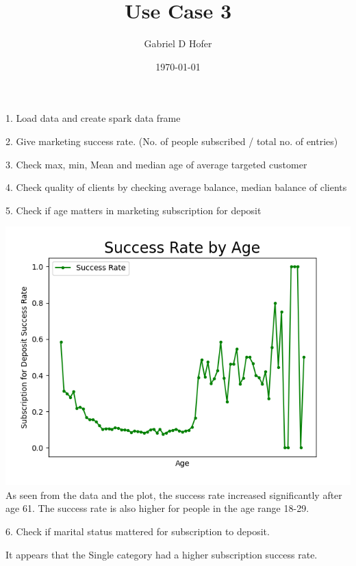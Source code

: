 \documentclass{article}
\title{Use Case 3}
\author{Gabriel D Hofer}
\date\today
\begin{document}
\maketitle



1. Load data and create spark data frame


2. Give marketing success rate. (No. of people subscribed / total no. of entries)


3. Check max, min, Mean and median age of average targeted customer


4. Check quality of clients by checking average balance, median balance of clients


5. Check if age matters in marketing subscription for deposit

\includegraphics[scale=0.85]{images/success_rate_by_age.png}
\newpage
As seen from the data and the plot, the success rate increased significantly after age 61.
The success rate is also higher for people in the age range 18-29.

6. Check if marital status mattered for subscription to deposit.

It appears that the Single category had a higher subscription success rate. 
\end{document}
